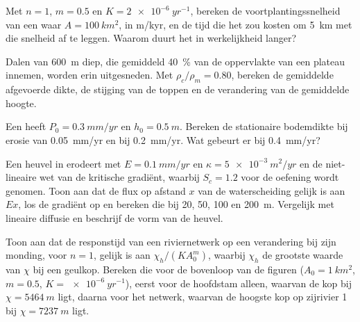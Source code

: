 \begin{exercise}[$\star\star$]\label{exo:b3:quantitative-geomorphology:7}
Met $n = 1$, $m = 0.5$ en $K = \qty{2e-6}{yr^{-1}}$, bereken de
voortplantingssnelheid van een  waar $A = \qty{100}{km^2}$, in m/kyr, en de
tijd die het zou kosten om \qty{5}{km} met die snelheid af te leggen. Waarom duurt
het in werkelijkheid langer?
\end{exercise}

\begin{exercise}[$\star\star$]\label{exo:b3:quantitative-geomorphology:8}
Dalen van \qty{600}{m} diep, die gemiddeld \qty{40}{\percent} van de
oppervlakte van een plateau innemen, worden erin uitgesneden. Met $\rho_c/\rho_m = 0.80$, bereken
de gemiddelde afgevoerde dikte, de stijging van de toppen en de verandering van de
gemiddelde hoogte.
\end{exercise}

\begin{exercise}[$\star\star$]\label{exo:b3:quantitative-geomorphology:9}
Een  heeft $P_0 = \qty{0.3}{mm/yr}$ en $h_0 =
\qty{0.5}{m}$. Bereken de stationaire bodemdikte bij erosie van
\qty{0.05}{mm/yr} en bij \qty{0.2}{mm/yr}. Wat gebeurt er bij
\qty{0.4}{mm/yr}?
\end{exercise}

\begin{exercise}[$\star\star\star$]\label{exo:b3:quantitative-geomorphology:10}
Een heuvel in  erodeert met $E = \qty{0.1}{mm/yr}$ en $\kappa =
\qty{5e-3}{m^2/yr}$ en de niet-lineaire wet van de kritische gradiënt, waarbij
$S_c = 1.2$ voor de oefening wordt genomen. Toon aan dat de flux op afstand $x$ van de
waterscheiding gelijk is aan $E x$, los de gradiënt op en bereken die bij 20, 50, 100 en
\qty{200}{m}. Vergelijk met lineaire diffusie en beschrijf de
vorm van de heuvel.
\end{exercise}

\begin{exercise}[$\star\star\star$]\label{exo:b3:quantitative-geomorphology:11}
Toon aan dat de responstijd van een riviernetwerk op een verandering bij zijn monding,
voor $n = 1$, gelijk is aan $\chi_h/(K A_0^m)$, waarbij $\chi_h$ de grootste waarde van
$\chi$ bij een geulkop. Bereken die voor de bovenloop van de figuren
($A_0 = \qty{1}{km^2}$, $m = 0.5$, $K = \qty{e-6}{yr^{-1}}$), eerst voor de hoofdstam
alleen, waarvan de kop bij $\chi = \qty{5464}{m}$ ligt, daarna voor het netwerk,
waarvan de hoogste kop op zijrivier 1 bij $\chi = \qty{7237}{m}$ ligt.
\end{exercise}

